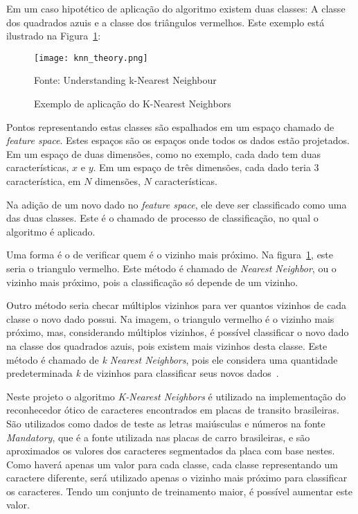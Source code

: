 Em um caso hipotético de aplicação do algoritmo existem duas classes: A classe
dos quadrados azuis e a classe dos triângulos vermelhos. Este exemplo está
ilustrado na Figura~\ref{fig:knearest_example}:

\begin{figure}[H]
	\centering
	\texttt{[image: knn\_theory.png]}
	\caption{Exemplo de aplicação do K-Nearest Neighbors}
Fonte: Understanding k-Nearest Neighbour~\cite{opencv2014knearest}
	\label{fig:knearest_example}
\end{figure}

Pontos representando estas classes são espalhados em um espaço chamado de
\emph{feature space}. Estes espaços são os espaços onde todos os dados estão
projetados. Em um espaço de duas dimensões, como no exemplo, cada dado tem duas
características, $x$ e $y$. Em um espaço de três dimensões, cada dado teria 3
característica, em $N$ dimensões, $N$ características.

Na adição de um novo dado no \emph{feature space}, ele deve ser classificado
como uma das duas classes. Este é o chamado de processo de classificação, no
qual o algoritmo é aplicado.

Uma forma é o de verificar quem é o vizinho mais próximo. Na
figura~\ref{fig:knearest_example}, este seria o triangulo vermelho. Este método
é chamado de \emph{Nearest Neighbor}, ou o vizinho mais próximo, pois a
classificação só depende de um vizinho.

Outro método seria checar múltiplos vizinhos para ver quantos vizinhos de cada
classe o novo dado possui. Na imagem, o triangulo vermelho é o vizinho mais
próximo, mas, considerando múltiplos vizinhos, é possível classificar o novo
dado na classe dos quadrados azuis, pois existem mais vizinhos desta classe.
Este método é chamado de \emph{k Nearest Neighbors}, pois ele considera uma
quantidade predeterminada \emph{k} de vizinhos para classificar seus novos
dados~\cite{opencv2014knearest}.

Neste projeto o algoritmo \emph{K-Nearest Neighbors} é utilizado na
implementação do reconhecedor ótico de caracteres encontrados em placas de
transito brasileiras. São utilizados como dados de teste as letras maiúsculas e
números na fonte \emph{Mandatory}, que é a fonte utilizada nas placas de carro
brasileiras, e são aproximados os valores dos caracteres segmentados da placa
com base nestes. Como haverá apenas um valor para cada classe, cada classe
representando um caractere diferente, será utilizado apenas o vizinho mais
próximo para classificar os caracteres. Tendo um conjunto de treinamento maior,
é possível aumentar este valor.

